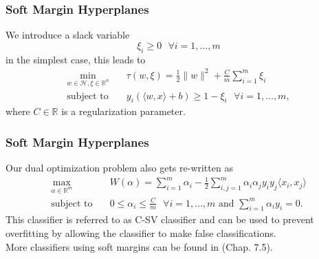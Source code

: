 \documentclass{beamer}
\begin{document}
\begin{frame}{}
	\frametitle{Soft Margin Hyperplanes}
	We introduce a slack variable
	\begin{equation}
		\xi_{ i } \geq 0 \text{ } \forall i = {1, \dots, m}
	\end{equation}
	in the simplest case, this leads to 
	\begin{equation}
		\begin{aligned}
			\min_{w \in \mathcal{H}, \xi \in \mathbb{R}^{n}} \quad & \tau (w, \xi) = \frac{1}{2} \lVert w \rVert^2 + \frac{C}{m} \sum_{i=1}^{m} \xi_{i} \\
			\textrm{subject to} \quad & y_{i} \left( \langle w,x \rangle + b \right) \geq 1 - \xi_{i} \text{ } \forall i = {1, \dots, m}, 
		\end{aligned}
	\end{equation}
    where $C \in \mathbb{R}$ is a regularization parameter.
\end{frame}


\begin{frame}{}
	\frametitle{Soft Margin Hyperplanes}
	Our dual optimization problem also gets re-written as
    \begin{equation} \label{eq:7}
        \begin{aligned}
            \max_{\alpha \in \mathbb{R}^m} \quad & W(\alpha) = \sum_{i=1}^{m} \alpha_i - \frac{1}{2} \sum_{i,j=1}^{m} \alpha_i \alpha_j y_i y_j \langle x_i,x_j \rangle \\
            \textrm{subject to} \quad & 0 \leq \alpha_i \leq \frac{C}{m} \text{ } \forall i = {1, \dots, m} \text{ and } \sum_{i=1}^{m} \alpha_i y_i = 0. 
        \end{aligned}
	\end{equation}
	This classifier is referred to as C-SV classifier and can be used to prevent overfitting by allowing the classifier to make false classifications. \\
	More classifiers using soft margins can be found in \cite{Schoelkopf}(Chap. 7.5).
\end{frame}
\end{document}

